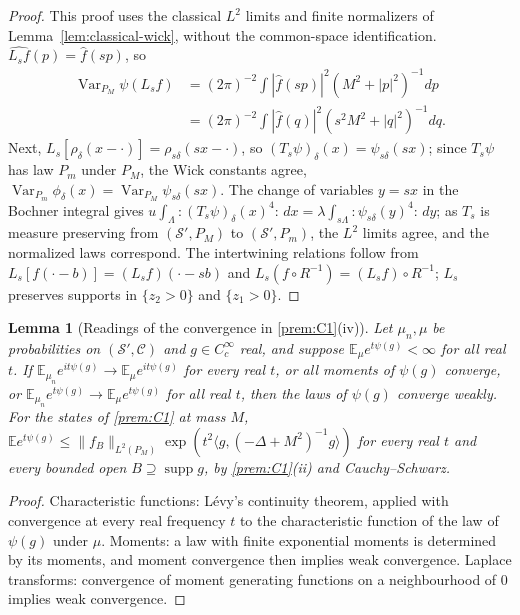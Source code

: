 \documentclass[11pt]{article}
\theoremstyle{plain}
\newtheorem{lemma}[theorem]{Lemma}
\theoremstyle{definition}
\theoremstyle{remark}
\newcommand{\E}{\mathbb{E}}
\newcommand{\cC}{\mathcal{C}}
\newcommand{\cS}{\mathcal{S}}
\DeclareMathOperator{\supp}{supp}
\DeclareMathOperator{\Var}{Var}
\begin{document}
\begin{proof}
This proof uses the classical $L^2$ limits and finite normalizers of
Lemma~\ref{lem:classical-wick}, without the common-space identification.
$\widehat{L_sf}(p)=\hat f(sp)$, so
\[
\begin{aligned}
\Var_{P_M}\psi(L_sf)&=(2\pi)^{-2}\int|\hat f(sp)|^{2}(M^{2}+|p|^{2})^{-1}dp\\
&=(2\pi)^{-2}\int|\hat f(q)|^{2}(s^{2}M^{2}+|q|^{2})^{-1}dq.
\end{aligned}
\]
Next,
$L_s[\rho_\delta(x-\cdot)]=\rho_{s\delta}(sx-\cdot)$, so $(T_s\psi)_\delta(x)=\psi_{s\delta}(sx)$; since
$T_s\psi$ has law $P_m$ under $P_M$, the Wick constants agree,
$\Var_{P_m}\phi_\delta(x)=\Var_{P_M}\psi_{s\delta}(sx)$. The change of variables $y=sx$ in the
Bochner integral gives
$u\int_\Lambda{:}(T_s\psi)_\delta(x)^{4}{:}\,dx=\lambda\int_{s\Lambda}{:}\psi_{s\delta}(y)^{4}{:}\,dy$; as
$T_s$ is measure preserving from $(\cS',P_M)$ to $(\cS',P_m)$, the $L^{2}$ limits agree, and
the normalized laws correspond. The intertwining relations follow from
$L_s[f(\cdot-b)]=(L_sf)(\cdot-sb)$ and $L_s(f\circ R^{-1})=(L_sf)\circ R^{-1}$; $L_s$ preserves
supports in $\{z_2>0\}$ and $\{z_1>0\}$.
\end{proof}

\begin{lemma}[Readings of the convergence in \ref{prem:C1}(iv)]\label{lem:readings}
Let $\mu_n,\mu$ be probabilities on $(\cS',\cC)$ and $g\in C_c^{\infty}$ real, and suppose
$\E_\mu e^{t\psi(g)}<\infty$ for all real $t$. If
$\E_{\mu_n}e^{it\psi(g)}\to\E_\mu e^{it\psi(g)}$ for every real $t$, or all moments of
$\psi(g)$ converge, or $\E_{\mu_n}e^{t\psi(g)}\to\E_\mu e^{t\psi(g)}$ for all real $t$, then the
laws of $\psi(g)$ converge weakly. For the states of \ref{prem:C1} at mass $M$,
$\E e^{t\psi(g)}\le\|f_B\|_{L^{2}(P_M)}\exp(t^{2}\langle g,(-\Delta+M^{2})^{-1}g\rangle)$ for
every real $t$ and every bounded open $B\supseteq\supp g$, by \ref{prem:C1}(ii) and
Cauchy--Schwarz.
\end{lemma}

\begin{proof}
Characteristic functions: L\'evy's continuity theorem, applied with convergence
at every real frequency $t$ to the characteristic function of the law of $\psi(g)$
under $\mu$. Moments: a law with finite exponential moments is determined by its
moments, and moment convergence then implies weak convergence. Laplace
transforms: convergence of moment generating functions on a neighbourhood of $0$
implies weak convergence.
\end{proof}
\end{document}
